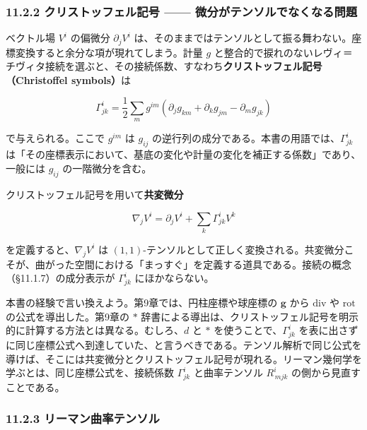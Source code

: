 \documentclass[a4paper,12pt,openany]{book}
\begin{document}
\hypertarget{ux30afux30eaux30b9ux30c8ux30c3ux30d5ux30a7ux30ebux8a18ux53f7-ux5faeux5206ux304cux30c6ux30f3ux30bdux30ebux3067ux306aux304fux306aux308bux554fux984c}{%
\subsubsection{11.2.2 クリストッフェル記号 ——
微分がテンソルでなくなる問題}\label{ux30afux30eaux30b9ux30c8ux30c3ux30d5ux30a7ux30ebux8a18ux53f7-ux5faeux5206ux304cux30c6ux30f3ux30bdux30ebux3067ux306aux304fux306aux308bux554fux984c}}

ベクトル場 \(V^i\) の偏微分 \(\partial_j V^i\)
は、そのままではテンソルとして振る舞わない。座標変換すると余分な項が現れてしまう。計量
\(g\)
と整合的で捩れのないレヴィ＝チヴィタ接続を選ぶと、その接続係数、すなわち\textbf{クリストッフェル記号（Christoffel symbols）}は

\[\Gamma^i_{jk} = \frac{1}{2}\sum_m g^{im}(\partial_j g_{km} + \partial_k g_{jm} - \partial_m g_{jk})\]

で与えられる。ここで \(g^{im}\) は \(g_{ij}\)
の逆行列の成分である。本書の用語では、\(\Gamma^i_{jk}\)
は「その座標表示において、基底の変化や計量の変化を補正する係数」であり、一般には
\(g_{ij}\) の一階微分を含む。

クリストッフェル記号を用いて\textbf{共変微分}

\[\nabla_j V^i = \partial_j V^i + \sum_k \Gamma^i_{jk} V^k\]

を定義すると、\(\nabla_j V^i\) は
\((1,1)\)-テンソルとして正しく変換される。共変微分こそが、曲がった空間における「まっすぐ」を定義する道具である。接続の概念（§11.1.7）の成分表示が
\(\Gamma^i_{jk}\) にほかならない。

本書の経験で言い換えよう。第9章では、円柱座標や球座標の \(\mathbf{g}\)
から \(\mathrm{div}\) や \(\mathrm{rot}\) の公式を導出した。第9章の
\(\ast\)
辞書による導出は、クリストッフェル記号を明示的に計算する方法とは異なる。むしろ、\(d\)
と \(\ast\) を使うことで、\(\Gamma^i_{jk}\)
を表に出さずに同じ座標公式へ到達していた、と言うべきである。テンソル解析で同じ公式を導けば、そこには共変微分とクリストッフェル記号が現れる。リーマン幾何学を学ぶとは、同じ座標公式を、接続係数
\(\Gamma^i_{jk}\) と曲率テンソル \(R^i_{\,mjk}\)
の側から見直すことである。

\hypertarget{ux30eaux30fcux30deux30f3ux66f2ux7387ux30c6ux30f3ux30bdux30eb}{%
\subsubsection{11.2.3
リーマン曲率テンソル}\label{ux30eaux30fcux30deux30f3ux66f2ux7387ux30c6ux30f3ux30bdux30eb}}
\end{document}
